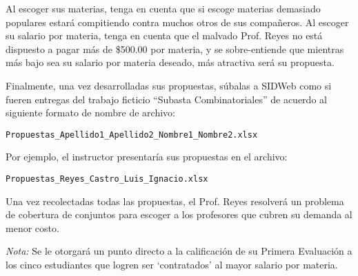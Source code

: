 \documentclass[ a4paper, twoside, 11pt]{article}
\begin{document}
Al escoger sus materias, tenga en cuenta que si escoge materias demasiado populares estar\'a compitiendo contra muchos otros de sus compa\~neros. Al escoger su salario por materia, tenga en cuenta que el malvado Prof. Reyes no est\'a dispuesto a pagar m\'as de \$500.00 por materia, y se sobre-entiende que mientras m\'as bajo sea su salario por materia deseado, m\'as atractiva ser\'a su propuesta. 

Finalmente, una vez desarrolladas sus propuestas, s\'ubalas a SIDWeb como si fueren entregas del trabajo ficticio ``Subasta Combinatoriales'' de acuerdo al siguiente formato de nombre de archivo: 
\begin{center}
\texttt{Propuestas\_Apellido1\_Apellido2\_Nombre1\_Nombre2.xlsx}
\end{center}

Por ejemplo, el instructor presentar\'ia sus propuestas en el archivo: 
\begin{center}
\texttt{Propuestas\_Reyes\_Castro\_Luis\_Ignacio.xlsx}
\end{center}

Una vez recolectadas todas las propuestas, el Prof. Reyes resolver\'a un problema de cobertura de conjuntos para escoger a los profesores que cubren su demanda al menor costo. 

\emph{Nota:} Se le otorgar\'a un punto directo a la calificaci\'on de su Primera Evaluaci\'on a los cinco estudiantes que logren ser `contratados' al mayor salario por materia. 
 
\end{document}

